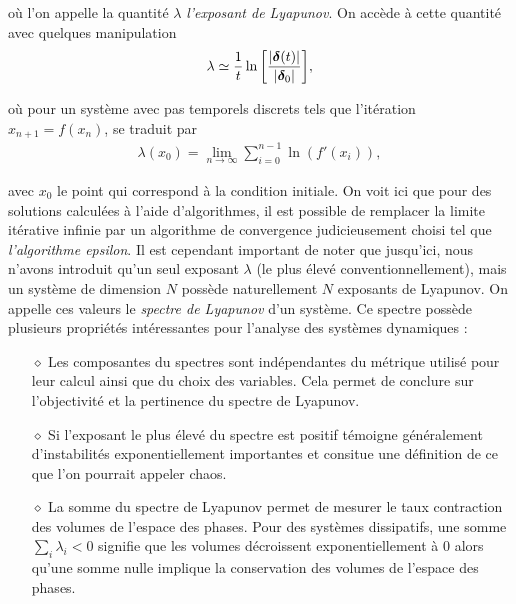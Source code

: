     où l'on appelle la quantité $\lambda$ \textit{l'exposant de Lyapunov}. On
    accède à cette quantité avec quelques manipulation
    \begin{align}
        \lambda \simeq
        \frac{1}{t}\ln\qty[\frac{|\bm{\delta}(t)|}{|\bm{\delta}_0|}],
    \end{align}

    où pour un système avec pas temporels discrets tels que l'itération
    $x_{n + 1} = f(x_n)$, se traduit par
    \begin{align}
        \lambda(x_0) = \lim_{n\to\infty}\sum_{i = 0}^{n - 1}\ln(f'(x_i)),
    \end{align}

    avec $x_0$ le point qui correspond à la condition initiale. On voit ici
    que pour des solutions calculées à l'aide d'algorithmes, il est possible
    de remplacer la limite itérative infinie par un algorithme de convergence
    judicieusement choisi tel que \textit{l'algorithme epsilon}. Il est
    cependant important de noter que jusqu'ici, nous n'avons introduit qu'un
    seul exposant $\lambda$ (le plus élevé conventionnellement), mais un
    système de dimension $N$ possède naturellement $N$ exposants de Lyapunov.
    On appelle ces valeurs le \textit{spectre de Lyapunov} d'un système. Ce
    spectre possède plusieurs propriétés intéressantes pour l'analyse des
    systèmes dynamiques \cite{LEs}: \\
    \begin{itemize}
        \item[$\diamond$] Les composantes du spectres sont indépendantes du
            métrique utilisé pour leur calcul ainsi que du choix des variables.
            Cela permet de conclure sur l'objectivité et la pertinence du
            spectre de Lyapunov. \\
        \item[$\diamond$] Si l'exposant le plus élevé du spectre est positif
            témoigne généralement d'instabilités exponentiellement importantes
            et consitue une définition de ce que l'on pourrait appeler chaos. \\
        \item[$\diamond$] La somme du spectre de Lyapunov permet de mesurer
            le taux contraction des volumes de l'espace des phases. Pour des
            systèmes dissipatifs, une somme $\sum_i\lambda_i < 0$ signifie que
            les volumes décroissent exponentiellement à 0 alors qu'une somme
            nulle implique la conservation des volumes de l'espace des phases.
    \end{itemize}

